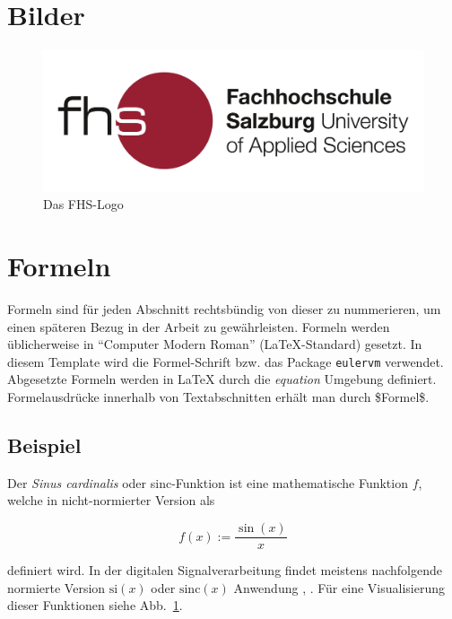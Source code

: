 \section{Bilder}

\begin{figure}[H]
\begin{center}
	\includegraphics[scale=0.4]{BilderAllgemein/Logo.jpg}
\end{center}
	\caption{Das FHS-Logo}
	\label{FIG_LOGO}
\end{figure}

\section{Formeln}

Formeln sind für jeden Abschnitt rechtsbündig von dieser zu nummerieren, um einen späteren Bezug in der Arbeit zu gewährleisten. Formeln werden üblicherweise in "`Computer Modern Roman"' (\LaTeX{}-Standard) gesetzt. In diesem Template wird die Formel-Schrift bzw. das Package \texttt{eulervm} verwendet. Abgesetzte Formeln werden in \LaTeX{} durch die 
\emph{equation} Umgebung definiert. Formelausdrücke innerhalb von Textabschnitten erhält man durch \$Formel\$.

\subsection*{Beispiel}
%
Der \emph{Sinus cardinalis} oder sinc-Funktion ist eine mathematische Funktion $f$, welche in nicht-normierter Version als

\begin{equation}
	f(x) := \frac{\sin(x)}{x}
	\label{eq:bsp}
\end{equation}

definiert wird. In der digitalen Signalverarbeitung findet meistens nachfolgende normierte Version $\mathrm{si}(x)$ oder $\mathrm{sinc}(x)$ Anwendung \cite{x1}, \cite{x2}. Für eine Visualisierung dieser Funktionen siehe Abb.~\ref{FIG_LOGO}.

